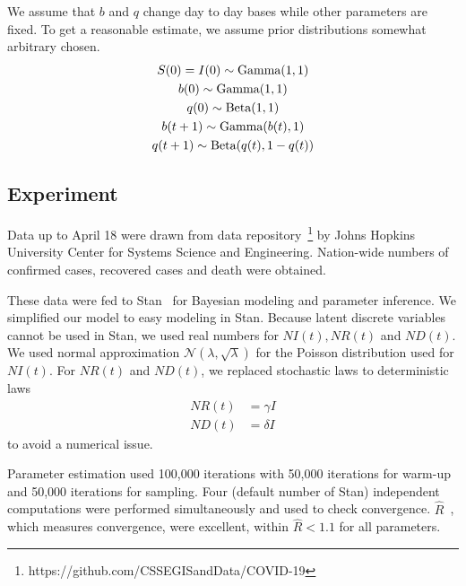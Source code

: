 \documentclass{amsart}
\begin{document}
We assume that $b$ and $q$ change day to day bases while other parameters are fixed.
To get a reasonable estimate, we assume prior distributions somewhat arbitrary chosen.
\begin{gather}
 S(0) = I(0) \sim \textup{Gamma}(1, 1)\\
 b(0) \sim \textup{Gamma}(1, 1)\\
 q(0) \sim \textup{Beta}(1, 1)\\
 b(t+1) \sim \textup{Gamma}(b(t), 1)\\
 q(t+1) \sim \textup{Beta}(q(t), 1-q(t))
\end{gather}



\subsection{Experiment}

Data up to April 18 were drawn from data repository~\footnote{https://github.com/CSSEGISandData/COVID-19} by Johns Hopkins University Center for Systems Science and Engineering.
Nation-wide numbers of confirmed cases, recovered cases and death were obtained.

These data were fed to Stan~\cite{carpenter2017stan} for Bayesian modeling and parameter inference.
We simplified our model to easy modeling in Stan.
Because latent discrete variables cannot be used in Stan, we used real numbers for $NI(t), NR(t)$ and $ND(t)$.
We used normal approximation $\mathcal{N}(\lambda, \sqrt{\lambda})$ for the Poisson distribution used for $NI(t)$.
For $NR(t)$ and $ND(t)$, we replaced stochastic laws to deterministic laws
\begin{align}
 NR(t) &= \gamma I\\
 ND(t) &= \delta I
\end{align}
to avoid a numerical issue.

Parameter estimation used 100,000 iterations with 50,000 iterations for warm-up and 50,000 iterations for sampling.
Four (default number of Stan) independent computations were performed simultaneously and used to check convergence.
$\hat{R}$~\cite{vehtari2019rank}, which measures convergence, were excellent, within $\hat{R} < 1.1$ for all parameters. 
\end{document}
